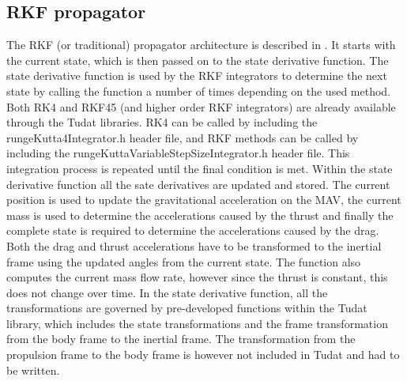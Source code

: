 %




\subsection{\ac{RKF} propagator}
\label{subsec:rkpropagator}
The \ac{RKF} (or traditional) propagator architecture is described in . It starts with the current state, which is then passed on to the state derivative function. The state derivative function is used by the \ac{RKF} integrators to determine the next state by calling the function a number of times depending on the used method. Both \ac{RK4} and \ac{RKF45} (and higher order \ac{RKF} integrators) are already available through the \ac{Tudat} libraries. \ac{RK4} can be called by including the rungeKutta4Integrator.h header file, and \ac{RKF} methods can be called by including the rungeKuttaVariableStepSizeIntegrator.h header file. This integration process is repeated until the final condition is met. Within the state derivative function all the sate derivatives are updated and stored. The current position is used to update the gravitational acceleration on the \ac{MAV}, the current mass is used to determine the accelerations caused by the thrust and finally the complete state is required to determine the accelerations caused by the drag. Both the drag and thrust accelerations have to be transformed to the inertial frame using the updated angles from the current state. The function also computes the current mass flow rate, however since the thrust is constant, this does not change over time. In the state derivative function, all the transformations are governed by pre-developed functions within the \ac{Tudat} library, which includes the state transformations and the frame transformation from the body frame to the inertial frame. The transformation from the propulsion frame to the body frame is however not included in \ac{Tudat} and had to be written.


